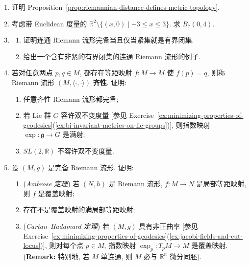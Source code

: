 \begin{RiemannExercise}\label{ex:hopf-rinow-theorem}
\begin{enumerate}[label=(\arabic*),ref=\arabic*,leftmargin=*]
\item\label{ex:proof-of-riemannian-metric-space-topology} 证明 Proposition~\ref{prop:riemannian-distance-defines-metric-topology}.
\item\label{ex:metric-ball-in-slit-plane} 考虑带 Euclidean 度量的 $\mathbb{R}^2\setminus\{(x,0)\mid-3\leq x\leq3\}$. 求 $B_7(0,4)$.
\item\label{ex:heine-borel-property-and-completeness}
\begin{enumerate}[label=(\alph*),leftmargin=*]
\item 证明连通 Riemann 流形完备当且仅当紧集就是有界闭集.
\item 给出一个含有非紧的有界闭集的连通 Riemann 流形的例子.
\end{enumerate}
\item\label{ex:completeness-of-homogeneous-manifolds} 若对任意两点 $p,q\in M$, 都存在等距映射 $f:M\to M$ 使 $f(p)=q$, 则称 Riemann 流形 $(M,\langle\cdot,\cdot\rangle)$ \textbf{齐性}. 证明:
\begin{enumerate}[label=(\alph*),leftmargin=*]
\item 任意齐性 Riemann 流形都完备;
\item 若 Lie 群 $G$ 容许双不变度量 [参见 Exercise~\ref{ex:minimizing-properties-of-geodesics}(\ref{ex:bi-invariant-metrics-on-lie-groups})], 则指数映射 $\exp:\mathfrak{g}\to G$ 是满射;
\item $SL(2,\mathbb{R})$ 不容许双不变度量.
\end{enumerate}
\item\label{ex:ambrose-and-cartan-hadamard-theorems} 设 $(M,g)$ 是完备 Riemann 流形. 证明:
\begin{enumerate}[label=(\alph*),leftmargin=*]
\item (\emph{Ambrose 定理}) 若 $(N,h)$ 是 Riemann 流形, $f:M\to N$ 是局部等距映射, 则 $f$ 是覆盖映射;
\item 存在不是覆盖映射的满局部等距映射;
\item (\emph{Cartan–Hadamard 定理}) 若 $(M,g)$ 具有非正曲率 [参见 Exercise~\ref{ex:minimizing-properties-of-geodesics}(\ref{ex:jacobi-fields-and-cut-locus})], 则对每个点 $p\in M$, 指数映射 $\exp_p:T_pM\to M$ 是覆盖映射.
{\small (\textbf{Remark:} 特别地, 若 $M$ 单连通, 则 $M$ 必与 $\mathbb{R}^n$ 微分同胚).}
\end{enumerate}
\end{enumerate}
\end{RiemannExercise}
